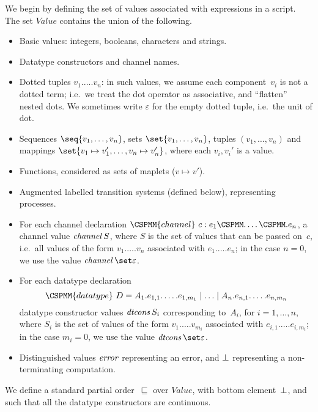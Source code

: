 We begin by defining the set of values associated with expressions in a
script.  The set $Value$ contains the union of the following. 
%
\begin{itemize}
\item Basic values: integers, booleans, characters and strings.

\item Datatype constructors and channel names.

\item Dotted tuples $v_1.\ldots.v_n$: in such values, we assume each
  component~$v_i$ is not a dotted term; i.e.~we treat the dot operator as
  associative, and ``flatten'' nested dots.  We sometimes write $\varepsilon$
  for the empty dotted tuple, i.e.~the unit of dot.

\item Sequences $\seq{v_1,\ldots,v_n}$, sets
  $\set{v_1,\ldots,v_n}$, tuples $(v_1,\ldots,v_n)$ and mappings
  $\set{v_1 \mapsto v_1', \ldots, v_n \mapsto v_n'}$, where each $v_i, v_i'$
  is a value.

\item Functions, considered as sets of maplets ($v \mapsto v'$).

\item Augmented labelled transition systems (defined below), representing
  processes.

\item For each channel declaration $\CSPMM{channel}~c : e_1\M.\ldots\M.e_n$, a
  channel value $\mathop{\it channel} S$, where $S$ is the set of values that can be
  passed on~$c$, i.e.~all values of the form $v_1.\ldots.v_n$ associated with
  $e_1.\ldots.e_n$; in the case $n=0$, we use the value $\channel
  \set\varepsilon$.

\item For each datatype declaration
\[
\CSPMM{datatype}~D = 
  A_1.e_{1,1}.\ldots.e_{1,m_1} \mid \ldots \mid A_n.e_{n,1}.\ldots.e_{n,m_n}
\]
datatype constructor values $\mathop{\it dtcons} S_i$ corresponding to~$A_i$, for $i =
1,\ldots,n$, where $S_i$ is the set of values of the form $v_1.\ldots.v_{m_i}$
associated with $e_{i,1}.\ldots.e_{i,m_i}$; in the case $m_i=0$, we use the
value $\dtcons\set\varepsilon$.

\item Distinguished values $\mathord{\it error}$ representing an error, and $\perp$
  representing a non-terminating computation.
\end{itemize}


We define a standard partial order~$\sqsubseteq$ over $Value$, with bottom
element~$\perp$, and such that all the datatype constructors are continuous.

